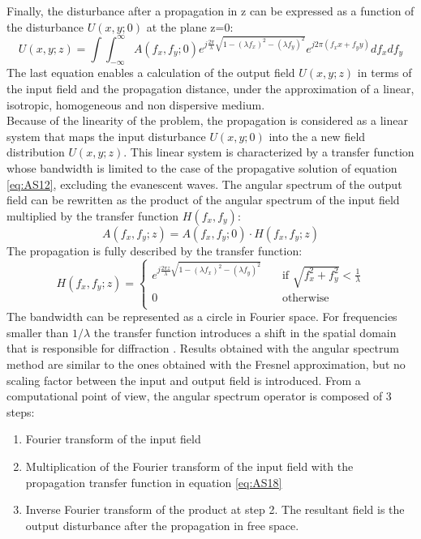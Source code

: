  Finally, the disturbance after a propagation in z can be expressed as a function of the disturbance $U(x,y;0)$ at the plane z=0:
 \begin{equation}
 \label{eq:AS16}
 U(x,y;z)=\int\int_{-\infty}^{\infty} A(f_x,f_y;0)e^{j \frac{2\pi}{\lambda}\sqrt{1-(\lambda f_x)^2-(\lambda f_y)^2}}e^{j2\pi(f_x x+f_y y)}df_x df_y
 \end{equation}
 The last equation enables a calculation of the output field $U(x,y;z)$ in terms of the input field and the propagation distance, under the approximation of a linear, isotropic, homogeneous and non dispersive medium.\\
 Because of the linearity of the problem, the propagation is considered as a linear system that maps the input disturbance $U(x,y;0)$ into the a new field distribution $U(x,y;z)$\cite{goodman2005introduction}. This linear system is characterized by a transfer function whose bandwidth is limited to the case of the propagative solution of equation \ref{eq:AS12}, excluding the evanescent waves. The angular spectrum of the output field can be rewritten as the product of the angular spectrum of the input field multiplied by the transfer function $H(f_x,f_y)$:
 \begin{equation}
 \label{eq:AS17}
 A(f_x,f_y;z) = A(f_x,f_y;0)\cdot H(f_x,f_y;z)
 \end{equation}
 The propagation is fully described by the transfer function:
 \begin{equation}
 \label{eq:AS18}
H(f_x,f_y;z)=\begin{cases}e^{j \frac{2\pi z}{\lambda}\sqrt{1-(\lambda f_x)^2-(\lambda f_y)^2}} & \quad \text{if } \sqrt{f_x^2+f_y^2}<\frac{1}{\lambda}\\ 0 & \quad \text{otherwise }\\ \end{cases} 
 \end{equation}
 The bandwidth can be represented as a circle in Fourier space. For frequencies smaller than $1/\lambda$ the transfer function introduces a shift in the spatial domain that is responsible for diffraction \cite{goodman2005introduction}.
 Results obtained with the angular spectrum method are similar to the ones obtained with the Fresnel approximation, but no scaling factor between the input and output field is introduced. 
 From a computational point of view, the angular spectrum operator is composed of 3 steps: 
 \begin{enumerate}
 	\item Fourier transform of the input field
 	\item Multiplication of the Fourier transform of the input field with the propagation transfer function in equation \ref{eq:AS18} 
 	\item Inverse Fourier transform of the product at step 2. The resultant field is the output disturbance after the propagation in free space. 
 \end{enumerate}
